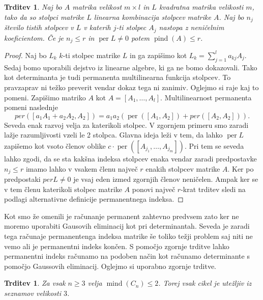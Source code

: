 \documentclass[12pt,a4paper,twoside]{article}
\theoremstyle{definition} %
\theoremstyle{plain} %
\newtheorem{trditev}[definicija]{Trditev}
\numberwithin{equation}{section}  %
\DeclareMathOperator{\per}{per}
\DeclareMathOperator{\mind}{mind}
\DeclareMathOperator{\pind}{pind}
\begin{document}
\begin{trditev}
\label{pind}
Naj bo $A$ matrika velikost $m \times l$ in $L$ kvadratna matrika velikosti $m$, tako da so stolpci matrike $L$ linearna kombinacija stolpcev matrike $A$. Naj bo $n_j$ število tistih stolpcev v $L$ v katerih $j$-ti stolpec $A_j$ nastopa z neničelnim koeficientom. Če je $n_j \le r$ in $\per L \neq 0$ potem $\pind (A) \le r$.
\end{trditev}
\begin{proof}
Naj bo $L_k$ $k$-ti stolpec matrike $L$ in ga zapišimo kot $L_k = \sum_{j=1}^l a_{kj}A_j$. Sedaj bomo uporabili dejstvo iz linearne algebre, ki ga ne bomo dokazovali. Tako kot determinanta je tudi permanenta multilinearna funkcija stolpcev. To pravzaprav ni težko preverit vendar dokaz tega ni zanimiv. Oglejmo si raje kaj to pomeni. Zapišimo matriko $A$ kot $A = [A_1, \ldots, A_l]$. Multilinearnost permanenta pomeni naslednje
$$ per([a_1A_1 + a_2A_2, A_2]) = a_1 a_2 \left( \per([A_1, A_2]) + per([A_2, A_2]) \right).$$
Seveda enak razvoj velja za katerikoli stolpec. V zgornjem primeru smo zaradi lažje razumljivosti vzeli le 2 stolpca. Glavna ideja leži v tem, da lahko $\per L$ zapišemo kot vsoto členov oblike $c \cdot \per([A_{j_1}, \dots, A_{j_m}])$. Pri tem se seveda lahko zgodi, da se sta kakšna indeksa stolpcev enaka vendar zaradi predpostavke $n_j \le r$ imamo lahko v vsakem členu največ $r$ enakih stolpcev matrike $A$. Ker po predpostaki $perL \neq 0$ je vsaj eden izmed zgornjih členov neničelen. Ampak ker se v tem členu katerikoli stolpec matrike $A$ ponovi največ $r$-krat trditev sledi na podlagi alternativne definicije permanentnega indeksa.
\end{proof}

Kot smo že omenili je računanje permanent zahtevno predvsem zato ker ne moremo uporabiti Gausovih eliminacij kot pri determinantah. Seveda je zaradi tega računaje permanentenga indeksa matrike še toliko težji problem saj niti ne vemo ali je permanentni indeks končen. S pomočjo zgornje trditve lahko permanentni indeks računamo na podoben način kot računamo determinante s pomočjo  Gaussovih eliminacij. Oglejmo si uporabno zgornje trditve.

\begin{trditev}
Za vsak $n \ge 3$ velja $\mind(C_n) \le 2$. Torej vsak cikel je utežljiv iz seznamov velikosti $3$.
\end{trditev}
\end{document}
